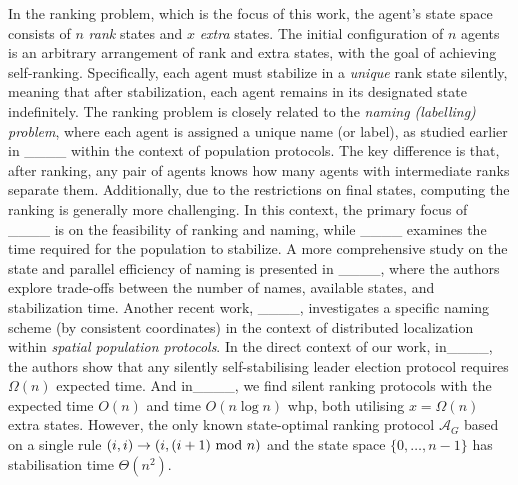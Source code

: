 In the ranking problem, which is the focus of this work, the agent's state space consists of 
$n$ {\em rank} states and $x$ {\em extra} states. The initial configuration of $n$ agents is 
an arbitrary arrangement of rank and extra states, with the goal of achieving self-ranking. 
Specifically, each agent must stabilize in a {\em unique} rank state silently, meaning that 
after stabilization, each agent remains in its designated state indefinitely.
%
The ranking problem is closely related to the {\em naming (labelling) problem}, where each agent is 
assigned a unique name (or label), as studied earlier in ____  within the context 
of population protocols. The key difference is that, after ranking, any pair of agents knows 
how many agents with intermediate ranks separate them. Additionally, due to the restrictions on 
final states, computing the ranking is generally more challenging.
%
In this context, the primary focus of ____ is on the feasibility of ranking and naming, 
while ____ examines the time required for the population to stabilize. A more comprehensive study 
on the state and parallel efficiency of naming is presented in ____, where the authors explore 
trade-offs between the number of names, available states, and stabilization time. Another recent work, 
____, investigates a specific naming scheme (by consistent coordinates) in the context of distributed 
localization within {\em spatial population protocols}.
%
In the direct context of our work, in____, the authors show that any silently self-stabilising leader election protocol requires $\Omega(n)$ expected time. And in____, we find silent ranking protocols with the expected time $O(n)$ and time $O(n\log n)$ whp, both utilising $x=\Omega(n)$ extra states. 
However, the only known state-optimal ranking protocol $\mathcal{A}_G$ based on a single rule $(i,i)\rightarrow (i,(i+1) {\rm\ mod\ } n)$ and the state space 
$\{0,\dots,n-1\}$ has stabilisation time $\Theta(n^2).$